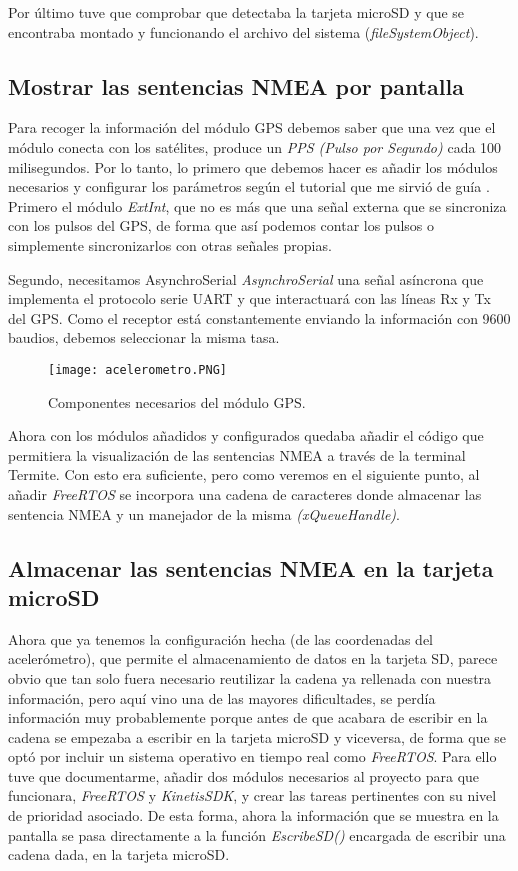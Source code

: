 Por último tuve que comprobar que detectaba la tarjeta microSD y que se encontraba montado y funcionando el archivo del sistema (\textit{fileSystemObject}).

\subsection{Mostrar las sentencias NMEA por pantalla}
Para recoger la información del módulo GPS debemos saber que una vez que el módulo conecta con los satélites, produce un \textit{PPS (Pulso por Segundo)} cada 100 milisegundos.
Por lo tanto, lo primero que debemos hacer es añadir los módulos necesarios y configurar los parámetros según el tutorial que me sirvió de guía \cite{tutorial2}. Primero el módulo \textit{ExtInt}, que no es más que una señal externa que se sincroniza con los pulsos del GPS, de forma que así podemos contar los pulsos o simplemente sincronizarlos con otras señales propias.

Segundo, necesitamos AsynchroSerial \textit{AsynchroSerial} una señal asíncrona que implementa el protocolo serie UART y que interactuará con las líneas Rx y Tx del GPS. Como el receptor está constantemente enviando la información con 9600 baudios, debemos seleccionar la misma tasa.
\begin{figure}[!h]
	\centering
	\texttt{[image: acelerometro.PNG]}
	\caption{Componentes necesarios del módulo GPS.}\label{fig:gps.PNG}
\end{figure}
\FloatBarrier

Ahora con los módulos añadidos y configurados quedaba añadir el código que permitiera la visualización de las sentencias NMEA a través de la terminal Termite. Con esto era suficiente, pero como veremos en el siguiente punto, al añadir \textit{FreeRTOS} se incorpora una cadena de caracteres donde almacenar las sentencia NMEA y un manejador de la misma \textit{(xQueueHandle)}.


\subsection{Almacenar las sentencias NMEA en la tarjeta microSD}
Ahora que ya tenemos la configuración hecha (de las coordenadas del acelerómetro), que permite el almacenamiento de datos en la tarjeta SD, parece obvio que tan solo fuera necesario reutilizar la cadena ya rellenada con nuestra información, pero aquí vino una de las mayores dificultades, se perdía información muy probablemente porque antes de que acabara de escribir en la cadena se empezaba a escribir en la tarjeta microSD y viceversa, de forma que se optó por incluir un sistema operativo en tiempo real como \textit{FreeRTOS}. Para ello tuve que documentarme, añadir dos módulos necesarios al proyecto para que funcionara, \textit{FreeRTOS} y \textit{KinetisSDK}, y crear las tareas pertinentes con su nivel de prioridad asociado. De esta forma, ahora la información que se muestra en la pantalla se pasa directamente a la función \textit{EscribeSD()} encargada de escribir una cadena dada, en la tarjeta microSD.


